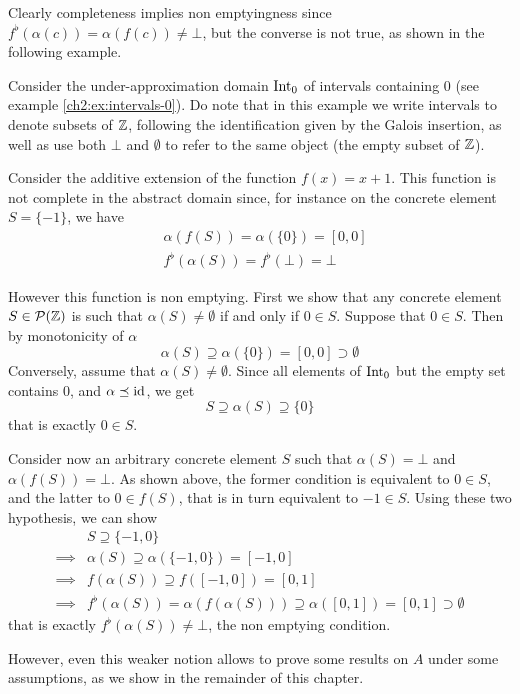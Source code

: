 Clearly completeness implies non emptyingness since $f^{\flat}(\alpha(c)) = \alpha(f(c)) \neq \bot$, but the converse is not true, as shown in the following example.
\begin{example}\label{ch3:ex:ne-not-complete}
	Consider the under-approximation domain $\text{Int}_0$ of intervals containing $0$ (see example \ref{ch2:ex:intervals-0}). Do note that in this example we write intervals to denote subsets of $\mathbb{Z}$, following the identification given by the Galois insertion, as well as use both $\bot$ and $\emptyset$ to refer to the same object (the empty subset of $\mathbb{Z}$).

	Consider the additive extension of the function $f(x) = x + 1$. This function is not complete in the abstract domain since, for instance on the concrete element $S = \{ -1 \}$, we have
	\begin{align*}
		&\alpha(f(S)) = \alpha(\{ 0 \}) = [0, 0] \\
		&f^{\flat}(\alpha(S)) = f^{\flat}(\bot) = \bot
	\end{align*}

	However this function is non emptying.
	First we show that any concrete element $S \in \mathcal{P}(\mathbb{Z})$ is such that $\alpha(S) \neq \emptyset$ if and only if $0 \in S$.
	Suppose that $0 \in S$. Then by monotonicity of $\alpha$
	\[
	\alpha(S) \supseteq \alpha(\{ 0 \}) = [0, 0] \supset \emptyset
	\]
	Conversely, assume that $\alpha(S) \neq \emptyset$. Since all elements of $\text{Int}_0$ but the empty set contains $0$, and $\alpha \preceq \text{id}$, we get
	\[
	S \supseteq \alpha(S) \supseteq \{ 0 \}
	\]
	that is exactly $0 \in S$.

	Consider now an arbitrary concrete element $S$ such that $\alpha(S) = \bot$ and $\alpha(f(S)) = \bot$. As shown above, the former condition is equivalent to $0 \in S$, and the latter to $0 \in f(S)$, that is in turn equivalent to $-1 \in S$. Using these two hypothesis, we can show
	\begin{align*}
		&S \supseteq \{ -1, 0 \} \\
		\implies& \alpha(S) \supseteq \alpha(\{ -1, 0 \}) = [-1, 0] \\
		\implies& f(\alpha(S)) \supseteq f([-1, 0]) = [0, 1] \\
		\implies& f^{\flat}(\alpha(S)) = \alpha(f(\alpha(S))) \supseteq \alpha([0, 1]) = [0, 1] \supset \emptyset
	\end{align*}
	that is exactly $f^{\flat}(\alpha(S)) \neq \bot$, the non emptying condition.
\end{example}
However, even this weaker notion allows to prove some results on $A$ under some assumptions, as we show in the remainder of this chapter.

